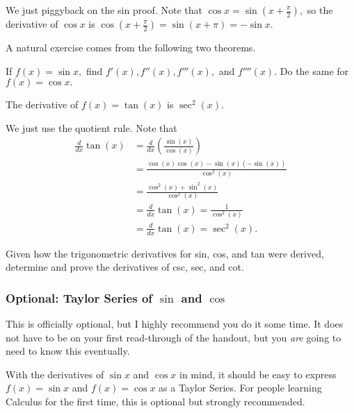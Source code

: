 \documentclass{article}
\begin{document}
\begin{pro}
We just piggyback on the sin proof. Note that $\cos x=\sin(x+\frac{\pi}{2}),$ so the derivative of $\cos x$ is $\cos(x+\frac{\pi}{2})=\sin(x+\pi)=-\sin x.$
\end{pro}

A natural exercise comes from the following two theorems.

\begin{exer}
If $f(x)=\sin x,$ find $f'(x),f''(x),f'''(x),$ and $f''''(x).$ Do the same for $f(x)=\cos x.$
\end{exer}

\begin{theo}
The derivative of $f(x) = \tan(x)$ is $\sec^2(x).$
\end{theo}

\begin{pro}
We just use the quotient rule. Note that
\begin{align*}
\frac{d}{dx}\tan(x) &= \frac{d}{dx}\left(\frac{\sin(x)}{\cos(x)}\right)\\
&= \frac{\cos(x)\cos(x) - \sin(x)(-\sin(x))}{\cos^2(x)} \\
&= \frac{\cos^2(x)+\sin^2(x)}{\cos^2(x)} \\
&= \frac{d}{dx}\tan(x) = \frac{1}{\cos^2(x)} \\
&= \frac{d}{dx}\tan(x) = \sec^2(x).
\end{align*}
\end{pro}

\begin{exer}
Given how the trigonometric derivatives for sin, cos, and tan were derived, determine and prove the derivatives of csc, sec, and cot.
\end{exer}

\subsubsection{Optional: Taylor Series of $\sin$ and $\cos$}

This is officially optional, but I highly recommend you do it some time. It does not have to be on your first read-through of the handout, but you \textit{are} going to need to know this eventually.

With the derivatives of $\sin x$ and $\cos x$ in mind, it should be easy to express $f(x)=\sin x$ and $f(x)=\cos x$ as a Taylor Series. For people learning Calculus for the first time, this is optional but strongly recommended.
\end{document}
